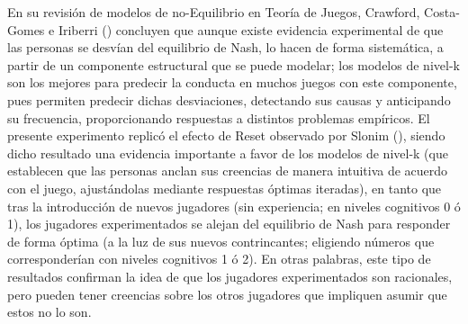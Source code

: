 En su revisión de modelos de no-Equilibrio en Teoría de Juegos, Crawford, Costa-Gomes e Iriberri (\citeyear{Crawford}) concluyen que aunque existe evidencia experimental de que las personas se desvían del equilibrio de Nash, lo hacen de forma sistemática, a partir de un componente estructural que se puede modelar; los modelos de nivel-k son los mejores para predecir la conducta en muchos juegos con este componente, pues permiten predecir dichas desviaciones, detectando sus causas y anticipando su frecuencia, proporcionando respuestas a distintos problemas empíricos. El presente experimento replicó el efecto de Reset observado por Slonim (\citeyear{Slonim}), siendo dicho resultado una evidencia importante a favor de los modelos de nivel-k (que establecen que las personas anclan sus creencias de manera intuitiva de acuerdo con el juego, ajustándolas mediante respuestas óptimas iteradas), en tanto que tras la introducción de nuevos jugadores (sin experiencia; en niveles cognitivos 0 ó 1), los jugadores experimentados se alejan del equilibrio de Nash para responder de forma óptima (a la luz de sus nuevos contrincantes; eligiendo números que corresponderían con niveles cognitivos 1 ó 2). En otras palabras, este tipo de resultados confirman la idea de que los jugadores experimentados son racionales, pero pueden tener  creencias sobre los otros jugadores que impliquen asumir que estos no lo son.\\
